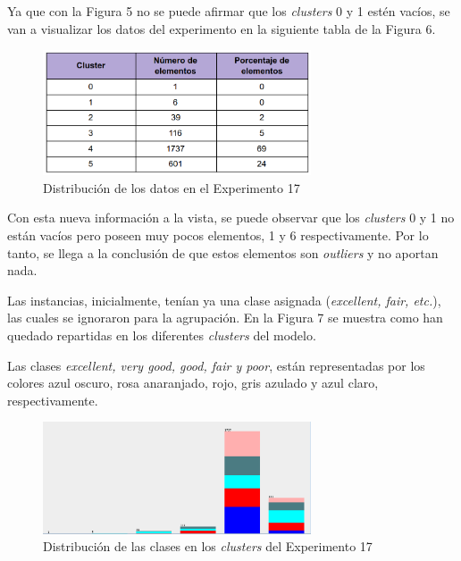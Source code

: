 \documentclass[12pt,a4paper, xcolor=table]{article}
\begin{document}
Ya que con la Figura 5 no se puede afirmar que los \textit{clusters} 0 y 1 estén vacíos, se van a visualizar los datos del experimento en la siguiente tabla de la Figura 6.

\begin{figure}[!h]
    \centering
    \includegraphics[width=300px]{img/clusters_mejor_exp.png}
    \caption{Distribución de los datos en el Experimento 17}
\end{figure}


Con esta nueva información a la vista, se puede observar que los \textit{clusters} 0 y 1 no están vacíos pero poseen muy pocos elementos, 1 y 6 respectivamente. Por lo tanto, se llega a la conclusión de que estos elementos son \textit{outliers} y no aportan nada\cite{outlier}.

\vspace{4mm}

Las instancias, inicialmente, tenían ya una clase asignada (\textit{excellent, fair, etc.}), las cuales se ignoraron para la agrupación. En la Figura 7 se muestra como han quedado repartidas en los diferentes \textit{clusters} del modelo.

\vspace{2mm}

Las clases \textit{excellent, very good, good, fair y poor}, están representadas por los colores azul oscuro, rosa anaranjado, rojo, gris azulado y azul claro, respectivamente.

\begin{figure}[!h]
  \centering
  \includegraphics[width=300px]{img/clusters_class.png}
  \caption{Distribución de las clases en los \textit{clusters} del Experimento 17}
\end{figure}

\newpage
\end{document}
